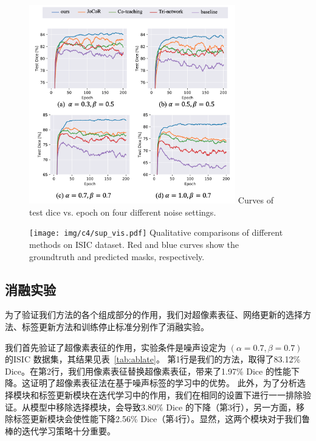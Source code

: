     \begin{figure}[tbp]
        \centering 
        \includegraphics[width=0.8\textwidth]{img/c4/c_test_curve2.png}
        {Curves of test dice vs. epoch on four different noise settings.} %
        \label{fig:test_dice}
    \end{figure}

    \begin{figure}[tbp]
        \centering 
        \texttt{[image: img/c4/sup\_vis.pdf]}
        {Qualitative comparisons of different methods on ISIC dataset. Red and blue curves show the groundtruth and predicted masks, respectively.}
        \label{fig:isic_vis}
    \end{figure}



\subsection{消融实验}
为了验证我们方法的各个组成部分的作用，我们对超像素表征、网络更新的选择方法、标签更新方法和训练停止标准分别作了消融实验。

我们首先验证了超像素表征的作用，实验条件是噪声设定为 $(\alpha=0.7, \beta=0.7)$ 的ISIC 数据集，其结果见表~\ref{tab:ablate}。
第1行是我们的方法，取得了83.12\% Dice。在第2行，我们用像素表征替换超像素表征，带来了1.97\% Dice 的性能下降。这证明了超像素表征法在基于噪声标签的学习中的优势。
此外，为了分析选择模块和标签更新模块在迭代学习中的作用，我们在相同的设置下进行一一排除验证。从模型中移除选择模块，会导致3.80\% Dice 的下降（第3行），另一方面，移除标签更新模块会使性能下降2.56\% Dice（第4行）。显然，这两个模块对于我们鲁棒的迭代学习策略十分重要。

